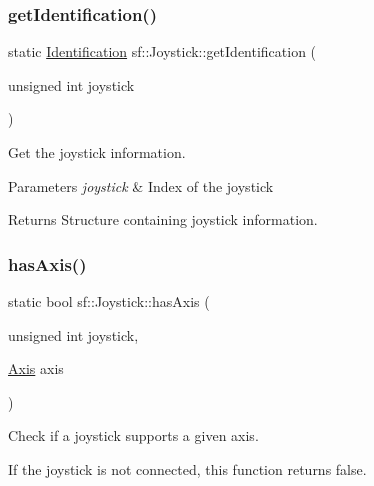 \subsubsection{\texorpdfstring{getIdentification()}{getIdentification()}}
{\footnotesize\ttfamily static \mbox{\hyperlink{structsf_1_1_joystick_1_1_identification}{Identification}} sf\+::\+Joystick\+::get\+Identification (\begin{DoxyParamCaption}\item[{unsigned int}]{joystick }\end{DoxyParamCaption})\hspace{0.3cm}{\ttfamily [static]}}



Get the joystick information. 


\begin{DoxyParams}{Parameters}
{\em joystick} & Index of the joystick\\
\hline
\end{DoxyParams}
\begin{DoxyReturn}{Returns}
Structure containing joystick information. \begin{DoxyVerb}\end{DoxyVerb}
 
\end{DoxyReturn}
\mbox{\label{classsf_1_1_joystick_a268e8f2a11ae6af4a47c727cb4ab4d95}} 
\subsubsection{\texorpdfstring{hasAxis()}{hasAxis()}}
{\footnotesize\ttfamily static bool sf\+::\+Joystick\+::has\+Axis (\begin{DoxyParamCaption}\item[{unsigned int}]{joystick,  }\item[{\mbox{\hyperlink{classsf_1_1_joystick_a48db337092c2e263774f94de6d50baa7}{Axis}}}]{axis }\end{DoxyParamCaption})\hspace{0.3cm}{\ttfamily [static]}}



Check if a joystick supports a given axis. 

If the joystick is not connected, this function returns false.


